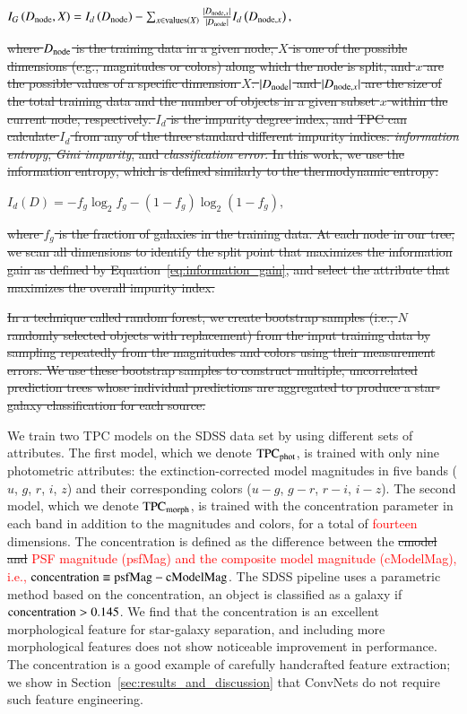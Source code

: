 \documentclass[fleqn,usenatbib]{mnras}
\newcommand{\eg}{{e.g., }}
\newcommand{\ie}{{i.e., }}
\newcommand{\changed}[1]{\textcolor{red}{#1}}
\begin{document}
\sout{ $ I_G \left(D_{{\mathrm{node}}}, X\right) = I_d \left( D_{{\mathrm{node}}} \right) - \sum_{x \in {\mathrm{values}}(X)} \frac{|D_{{\mathrm{node}}, x}|}{|D_{{\mathrm{node}}}|} I_d \left( D_{{\mathrm{node}}, x} \right), $ }

\sout{ \noindent where $D_{{\mathrm{node}}}$ is the training data in a given node, $X$ is one of the possible dimensions (\eg magnitudes or colors) along which the node is split, and $x$ are the possible values of a specific dimension $X$.  $|D_{{\mathrm{node}}}|$ and $|D_{{\mathrm{node}}, x}|$ are the size of the total training data and the number of objects in a given subset $x$ within the current node, respectively.  $I_d$ is the impurity degree index, and TPC can calculate $I_d$ from any of the three standard different impurity indices: \textit{information entropy}, \textit{Gini impurity}, and \textit{classification error}.  In this work, we use the information entropy, which is defined similarly to the thermodynamic entropy: }

\sout{ $ I_d \left( D \right) = - f_g \log_{2} f_g - \left(1 - f_g\right) \log_{2} \left(1 - f_g\right), $ }

\sout{ \noindent where $f_g$ is the fraction of galaxies in the training data.  At each node in our tree, we scan all dimensions to identify the split point that maximizes the information gain as defined by Equation~\ref{eq:information_gain}, and select the attribute that maximizes the overall impurity index.  }

\sout{ In a technique called random forest, we create bootstrap samples (\ie $N$ randomly selected objects with replacement) from the input training data by sampling repeatedly from the magnitudes and colors using their measurement errors.  We use these bootstrap samples to construct multiple, uncorrelated prediction trees whose individual predictions are aggregated to produce a star-galaxy classification for each source.  }

We train two TPC models on the SDSS data set by using different sets of
attributes.
The first model, which we denote ${\mathrm{TPC}}_{{\mathrm{phot}}}$, is trained with
only nine photometric attributes:
the extinction-corrected model magnitudes in five bands
($u$, $g$, $r$, $i$, $z$)
and their corresponding colors
($u-g$, $g-r$, $r-i$, $i-z$).
The second model, which we denote ${\mathrm{TPC}}_{{\mathrm{morph}}}$, is trained with
the concentration parameter in each band in addition to the magnitudes and
colors, for a total of
\changed{
fourteen
}
dimensions.
The concentration is defined as the difference between the
\sout{cmodel and}
\changed{
PSF magnitude (psfMag) and the composite model magnitude (cModelMag), \ie
}
${\mathrm{concentration}}\equiv{\mathrm{psfMag}}-{\mathrm{cModelMag}}$.
The SDSS pipeline uses a parametric method based on the concentration,
an object is classified as a galaxy if ${\mathrm{concentration}}>0.145$.
We find that the concentration is an excellent morphological feature
for star-galaxy separation, and including more morphological features
does not show noticeable improvement in performance.
The concentration is a good example of carefully handcrafted feature extraction;
we show in Section~\ref{sec:results_and_discussion}
that ConvNets do not require such feature engineering.
\end{document}
